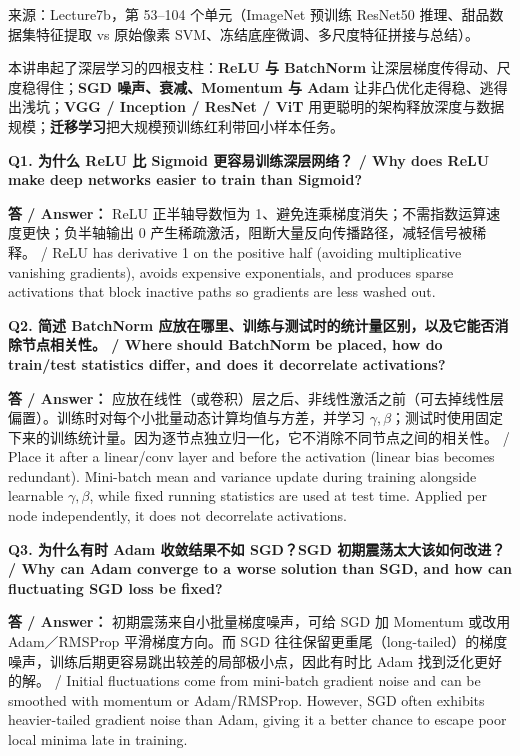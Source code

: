 来源：Lecture7b，第 53–104 个单元（ImageNet 预训练 ResNet50 推理、甜品数据集特征提取 vs 原始像素 SVM、冻结底座微调、多尺度特征拼接与总结）。



本讲串起了深层学习的四根支柱：\textbf{ReLU 与 BatchNorm} 让深层梯度传得动、尺度稳得住；\textbf{SGD 噪声、衰减、Momentum 与 Adam} 让非凸优化走得稳、逃得出浅坑；\textbf{VGG / Inception / ResNet / ViT} 用更聪明的架构释放深度与数据规模；\textbf{迁移学习}把大规模预训练红利带回小样本任务。

\textbf{Q1. 为什么 ReLU 比 Sigmoid 更容易训练深层网络？ / Why does ReLU make deep networks easier to train than Sigmoid?}

\textbf{答 / Answer：} ReLU 正半轴导数恒为 1、避免连乘梯度消失；不需指数运算速度更快；负半轴输出 0 产生稀疏激活，阻断大量反向传播路径，减轻信号被稀释。 / ReLU has derivative 1 on the positive half (avoiding multiplicative vanishing gradients), avoids expensive exponentials, and produces sparse activations that block inactive paths so gradients are less washed out.

\textbf{Q2. 简述 BatchNorm 应放在哪里、训练与测试时的统计量区别，以及它能否消除节点相关性。 / Where should BatchNorm be placed, how do train/test statistics differ, and does it decorrelate activations?}

\textbf{答 / Answer：} 应放在线性（或卷积）层之后、非线性激活之前（可去掉线性层偏置）。训练时对每个小批量动态计算均值与方差，并学习 $\gamma,\beta$；测试时使用固定下来的训练统计量。因为逐节点独立归一化，它不消除不同节点之间的相关性。 / Place it after a linear/conv layer and before the activation (linear bias becomes redundant). Mini-batch mean and variance update during training alongside learnable $\gamma,\beta$, while fixed running statistics are used at test time. Applied per node independently, it does not decorrelate activations.

\textbf{Q3. 为什么有时 Adam 收敛结果不如 SGD？SGD 初期震荡太大该如何改进？ / Why can Adam converge to a worse solution than SGD, and how can fluctuating SGD loss be fixed?}

\textbf{答 / Answer：} 初期震荡来自小批量梯度噪声，可给 SGD 加 Momentum 或改用 Adam／RMSProp 平滑梯度方向。而 SGD 往往保留更重尾（long-tailed）的梯度噪声，训练后期更容易跳出较差的局部极小点，因此有时比 Adam 找到泛化更好的解。 / Initial fluctuations come from mini-batch gradient noise and can be smoothed with momentum or Adam/RMSProp. However, SGD often exhibits heavier-tailed gradient noise than Adam, giving it a better chance to escape poor local minima late in training.

